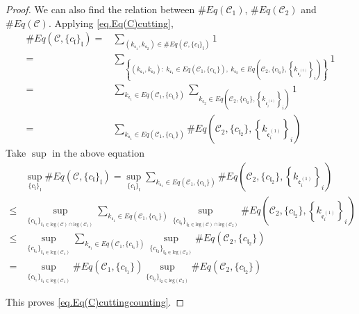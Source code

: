 \begin{proof}
We can also find the relation between $\#Eq(\mathcal{C}_1)$, $\#Eq(\mathcal{C}_2)$ and $\#Eq(\mathcal{C})$. Applying \eqref{eq.Eq(C)cutting},
\begin{equation}
\begin{split}
    \#Eq(\mathcal{C},\{c_{\mathfrak{l}}\}_{\mathfrak{l}})=&\sum_{(k_{\mathfrak{e}_1},k_{\mathfrak{e}_{2}})\in \#Eq(\mathcal{C},\{c_{\mathfrak{l}}\}_{\mathfrak{l}})} 1
    \\
    =&\sum_{\left\{(k_{\mathfrak{e}_1},k_{\mathfrak{e}_{2}}):\ k_{\mathfrak{e}_1}\in Eq(\mathcal{C}_1,\{c_{\mathfrak{l}_1}\}),\  k_{\mathfrak{e}_{2}}\in Eq\left(\mathcal{C}_{2}, \{c_{\mathfrak{l}_2}\}, \left\{k_{\mathfrak{e}_{i}^{(1)}}\right\}_{i}\right)\right\}} 1
    \\
    =&\sum_{k_{\mathfrak{e}_1}\in Eq(\mathcal{C}_1,\{c_{\mathfrak{l}_1}\})} \sum_{k_{\mathfrak{e}_{2}}\in Eq\left(\mathcal{C}_{2}, \{c_{\mathfrak{l}_2}\}, \left\{k_{\mathfrak{e}_{i}^{(1)}}\right\}_{i}\right)} 1
    \\
    =&\sum_{k_{\mathfrak{e}_1}\in Eq(\mathcal{C}_1,\{c_{\mathfrak{l}_1}\})} \# Eq\left(\mathcal{C}_{2}, \{c_{\mathfrak{l}_2}\}, \left\{k_{\mathfrak{e}_{i}^{(1)}}\right\}_{i}\right)
\end{split}
\end{equation}
Take $\sup$ in the above equation
\begin{equation}
\begin{split}
    &\sup_{\{c_{\mathfrak{l}}\}_{\mathfrak{l}}}\#Eq(\mathcal{C},\{c_{\mathfrak{l}}\}_{\mathfrak{l}})
    =\sup_{\{c_{\mathfrak{l}}\}_{\mathfrak{l}}}\sum_{k_{\mathfrak{e}_1}\in Eq(\mathcal{C}_1,\{c_{\mathfrak{l}_1}\})} \# Eq\left(\mathcal{C}_{2}, \{c_{\mathfrak{l}_2}\}, \left\{k_{\mathfrak{e}_{i}^{(1)}}\right\}_{i}\right)
    \\
    \le &\sup_{\{c_{\mathfrak{l}_1}\}_{\mathfrak{l}_1\in \text{leg}(\mathcal{C})\cap \text{leg}(\mathcal{C}_1)} }\sum_{k_{\mathfrak{e}_1}\in Eq(\mathcal{C}_1,\{c_{\mathfrak{l}_1}\})} \sup_{\{c_{\mathfrak{l}_2}\}_{\mathfrak{l}_2\in \text{leg}(\mathcal{C})\cap \text{leg}(\mathcal{C}_2)} }\# Eq\left(\mathcal{C}_{2}, \{c_{\mathfrak{l}_2}\}, \left\{k_{\mathfrak{e}_{i}^{(1)}}\right\}_{i}\right)
    \\
    \le &\sup_{\{c_{\mathfrak{l}_1}\}_{\mathfrak{l}_1\in \text{leg}(\mathcal{C}_1)} }\sum_{k_{\mathfrak{e}_1}\in Eq(\mathcal{C}_1,\{c_{\mathfrak{l}_1}\})} \sup_{\{c_{\mathfrak{l}_2}\}_{\mathfrak{l}_2\in \text{leg}(\mathcal{C}_2)} }\# Eq(\mathcal{C}_{2}, \{c_{\mathfrak{l}_2}\})
    \\
    = &\sup_{\{c_{\mathfrak{l}_1}\}_{\mathfrak{l}_1\in \text{leg}(\mathcal{C}_1)} } \# Eq(\mathcal{C}_1,\{c_{\mathfrak{l}_1}\}) \sup_{\{c_{\mathfrak{l}_2}\}_{\mathfrak{l}_2\in \text{leg}(\mathcal{C}_2)} }\# Eq(\mathcal{C}_{2}, \{c_{\mathfrak{l}_2}\})
\end{split}
\end{equation}

This proves \eqref{eq.Eq(C)cuttingcounting}.
\end{proof}



